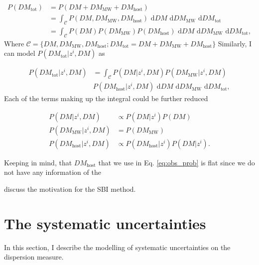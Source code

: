 \begin{equation}
\begin{split}
    P(DM_\text{tot}) &= P(DM + DM_{\text{MW}} + DM_{\text{host}}) \\
    & = \int_{\mathcal{C}} P(DM, DM_{\text{MW}},  DM_{\text{host}}) \text{ d}DM \text{ d}DM_{\text{MW}}
    \text{ d}DM_{\text{tot}} \\ 
    & = \int_{\mathcal{C}} P(DM)P(DM_{\text{MW}})  P(DM_{\text{host}}) \text{ d}DM \text{ d}DM_{\text{MW}}
    \text{ d}DM_{\text{tot}},
\end{split}
\end{equation}
Where $\mathcal{C} = \{DM, DM_{\text{MW}},  DM_{\text{host}}; DM_{\text{tot}} = DM + DM_{\text{MW}} + DM_{\text{host}}\}$
Similarly, I can model $P(DM_\text{tot}|z^i, DM)$ as 

\begin{equation}
    \begin{split}
        P(DM_\text{tot}|z^i, DM)  &=  \int_{\mathcal{C}} P(DM|z^i, DM)P(DM_{\text{MW}}|z^i, DM)  \\ &P(DM_{\text{host}}|z^i, DM) \text{ d}DM \text{ d}DM_{\text{MW}}
    \text{ d}DM_{\text{tot}},
    \end{split}
\end{equation}
Each of the terms making up the integral could be further reduced 


\begin{align}
    P(DM|z^i, DM) & \propto P(DM|z^i) P(DM) \\
    P(DM_{\text{MW}}|z^i, DM) & = P(DM_{\text{MW}}) \\
    P(DM_{\text{host}}|z^i, DM) & \propto P(DM_{\text{host}}|z^i)P(DM|z^i).
\end{align}

Keeping in mind, that $DM_{\text{host}}$ that we use in Eq. \ref{eq:obs_prob} is flat since we do not have any information of the 




discuss the motivation for the SBI method.

\section{The systematic uncertainties} \label{theory_sec:uncertainties}
In this section, I describe the modelling of systematic uncertainties on the dispersion measure. 


